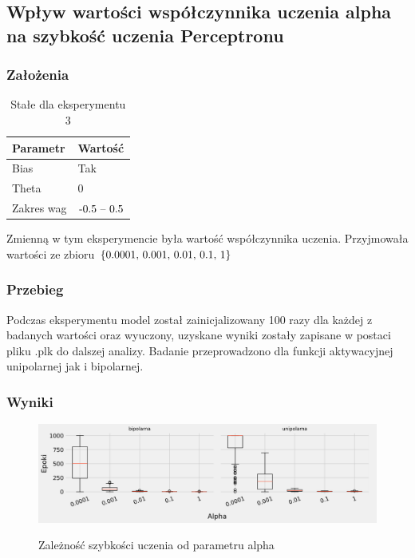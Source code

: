 \documentclass{article}
\begin{document}
\newpage
\subsection{Wpływ wartości współczynnika uczenia alpha na szybkość uczenia Perceptronu}
\subsubsection*{Założenia}

\begin{table}[!h]
	\caption{Stałe dla eksperymentu 3}
	\label{tabela-const-3}
	\centering
	\begin{tabular}{ll}
		\toprule
		Parametr   & Wartość         \\
		\midrule
		Bias       & Tak               \\
		Theta      & 0                 \\
		Zakres wag & \($-0.5 -- 0.5$\) \\
		\bottomrule
	\end{tabular}
\end{table}

Zmienną w tym eksperymencie była wartość współczynnika uczenia. Przyjmowała wartości ze zbioru \(\{$0.0001, 0.001, 0.01, 0.1, 1$\}\)

\subsubsection*{Przebieg}

Podczas eksperymentu model został zainicjalizowany 100 razy dla każdej z badanych wartości oraz wyuczony, uzyskane wyniki zostały zapisane w postaci pliku .plk do dalszej analizy. Badanie przeprowadzono dla funkcji aktywacyjnej unipolarnej jak i bipolarnej.

\subsubsection*{Wyniki}

\begin{figure}[!h]
	\centering
	\caption{Zależność szybkości uczenia od parametru alpha}
	\includegraphics[width=\textwidth]{per_alpha.png}
	\label{fig:res4}
\end{figure}
\end{document}
